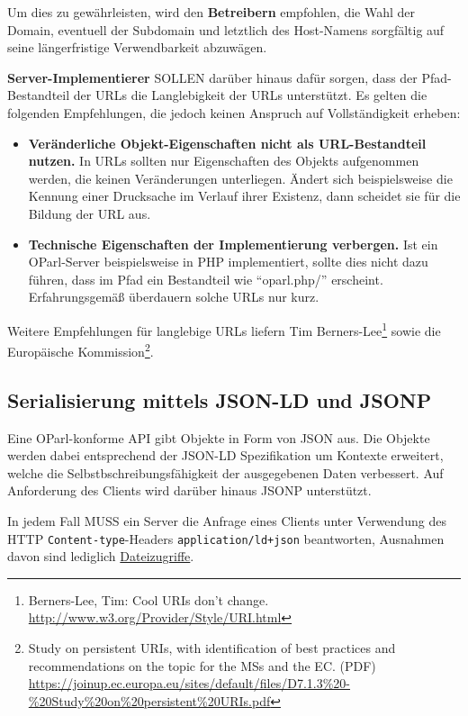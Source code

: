 \documentclass[,a4paper]{article}
\begin{document}
Um dies zu gewährleisten, wird den \textbf{Betreibern} empfohlen, die
Wahl der Domain, eventuell der Subdomain und letztlich des Host-Namens
sorgfältig auf seine längerfristige Verwendbarkeit abzuwägen.

\textbf{Server-Implementierer} SOLLEN darüber hinaus dafür sorgen, dass
der Pfad-Bestandteil der URLs die Langlebigkeit der URLs unterstützt. Es
gelten die folgenden Empfehlungen, die jedoch keinen Anspruch auf
Vollständigkeit erheben:

\begin{itemize}
\item
  \textbf{Veränderliche Objekt-Eigenschaften nicht als URL-Bestandteil
  nutzen.} In URLs sollten nur Eigenschaften des Objekts aufgenommen
  werden, die keinen Veränderungen unterliegen. Ändert sich
  beispielsweise die Kennung einer Drucksache im Verlauf ihrer Existenz,
  dann scheidet sie für die Bildung der URL aus.
\item
  \textbf{Technische Eigenschaften der Implementierung verbergen.} Ist
  ein OParl-Server beispielsweise in PHP implementiert, sollte dies
  nicht dazu führen, dass im Pfad ein Bestandteil wie ``oparl.php/''
  erscheint. Erfahrungsgemäß überdauern solche URLs nur kurz.
\end{itemize}

Weitere Empfehlungen für langlebige URLs liefern Tim
Berners-Lee\footnote{Berners-Lee, Tim: Cool URIs don't change.
  \url{http://www.w3.org/Provider/Style/URI.html}} sowie die Europäische
Kommission\footnote{Study on persistent URIs, with identification of
  best practices and recommendations on the topic for the MSs and the
  EC. (PDF)
  \url{https://joinup.ec.europa.eu/sites/default/files/D7.1.3\%20-\%20Study\%20on\%20persistent\%20URIs.pdf}}.

\subsection{Serialisierung mittels JSON-LD und
JSONP}\label{serialisierung-mittels-json-ld-und-jsonp}

Eine OParl-konforme API gibt Objekte in Form von JSON aus. Die Objekte
werden dabei entsprechend der JSON-LD Spezifikation um Kontexte
erweitert, welche die Selbstbschreibungsfähigkeit der ausgegebenen Daten
verbessert. Auf Anforderung des Clients wird darüber hinaus JSONP
unterstützt.

In jedem Fall MUSS ein Server die Anfrage eines Clients unter Verwendung
des HTTP \texttt{Content-type}-Headers \texttt{application/ld+json}
beantworten, Ausnahmen davon sind lediglich
\hyperref[dateizugriff]{Dateizugriffe}.
\end{document}
